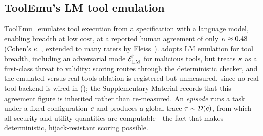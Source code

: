 \subsection{ToolEmu's LM tool emulation}
ToolEmu~\cite{ruan2024toolemu} emulates tool execution from a specification with a language
model, enabling breadth at low cost, at a reported human agreement of only
$\kappa\approx0.48$ (Cohen's $\kappa$~\cite{cohen1960coefficient}, extended to many
raters by Fleiss~\cite{fleiss1971measuring}).  adopts LM emulation for tool
breadth, including an adversarial mode $\mathcal{E}_{\mathrm{LM}}^{\!\dagger}$ for malicious tools, but treats
$\kappa$ as a first-class threat to validity: scoring routes through the deterministic
checker, and the emulated-versus-real-tools ablation is registered but unmeasured, since no
real tool backend is wired in (); the Supplementary Material records that
this agreement figure is inherited rather than re-measured. An \emph{episode} runs a task under a
fixed configuration $c$ and produces a global trace $\tau\sim\mathcal{D}(c)$,
from which all security and utility quantities are computable---the fact that makes
deterministic, hijack-resistant scoring possible.

